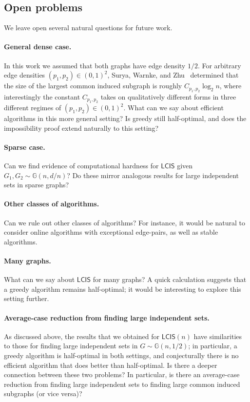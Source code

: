 \documentclass[11pt]{article}
\theoremstyle{plain}
\theoremstyle{definition}
\theoremstyle{remark}
\newcommand{\Gnhalf}{\mathbb{G}(n,1/2)}
\newcommand{\MCS}{\mathsf{LCIS}}
\begin{document}
\subsection{Open problems}
We leave open several natural questions for future work. 

    \paragraph{General dense case.} In this work we assumed that both graphs have edge density $1/2$. For arbitrary edge densities $(p_1, p_2) \in (0,1)^2$, Surya, Warnke, and Zhu~\cite{SWZ25} 
    determined that the size of the largest common induced subgraph is roughly $C_{p_1, p_2} \log_{2} n$, where interestingly the constant $C_{p_1, p_2}$ takes on qualitatively different forms in three different regimes of $(p_{1}, p_{2}) \in (0,1)^{2}$. 
    What can we say about efficient algorithms in this more general setting? Is greedy still half-optimal, and does the impossibility proof extend naturally to this setting?
    
    
    \paragraph{Sparse case.} Can we find evidence of computational hardness for $\MCS$ given $G_1, G_2 \sim \mathbb{G}(n,d/n)$? Do these mirror analogous results for large independent sets in sparse graphs?
    
    \paragraph{Other classes of algorithms.} Can we rule out other classes of algorithms? For instance, it would be natural to consider online algorithms with exceptional edge-pairs, as well as stable algorithms.

    \paragraph{Many graphs.} What can we say about $\MCS$ for many graphs? A quick calculation suggests that a greedy algorithm remains half-optimal; it would be interesting to explore this setting further. %

    \paragraph{Average-case reduction from finding large independent sets.} 
    As discussed above, the results that we obtained for $\MCS(n)$ have similarities to those for finding large independent sets in $G \sim \Gnhalf$; in particular, a greedy algorithm is half-optimal in both settings, and conjecturally there is no efficient algorithm that does better than half-optimal. 
    Is there a deeper connection between these two problems? In particular, is there an average-case reduction from finding large independent sets to finding large common induced subgraphs (or vice versa)? 
\end{document}
